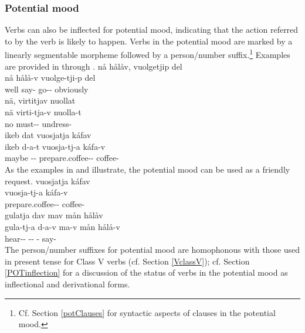 \subsubsection{Potential mood}\label{POTmood}
Verbs can also be inflected for potential mood, indicating that the action referred to by the verb is likely to happen. Verbs in the potential mood are marked by a linearly segmentable morpheme  followed by a person/number suffix.\footnote{Cf. Section \ref{potClauses} for syntactic aspects of clauses in the potential mood.} 
Examples are provided in  through .
\ea\label{potentialEx1}
\glll	nå hålåv, vuolgetjip del\\
	nå hålå-v vuolge-tji-p del\\
	well say- go-- obviously\\\nopagebreak
{}	
\z
\ea\label{potentialEx2}
\glll	nä, virtitjav nuollat\\
	nä virti-tja-v nuolla-t\\
	no must-- undress-\\\nopagebreak
{}	
\z
\ea\label{potentialEx3}
\glll	ikeb dat vuosjatja káfav\\
	ikeb d-a-t vuosja-tj-a káfa-v\\
	maybe -- prepare.coffee-- coffee-\\\nopagebreak
{}	
\z
As the examples in  and  illustrate, the potential mood can be used as a friendly request. 
\ea\label{potentialEx4}%
\glll	vuosjatja káfav\\
	vuosja-tj-a káfa-v\\
	prepare.coffee-- coffee-\\\nopagebreak
{}	
\z
\ea\label{potentialEx5}%
\glll	gulatja dav mav mån hålåv\\
	gula-tj-a d-a-v ma-v mån hålå-v\\
	hear-- -- -  say-\\\nopagebreak
{}	
\z
The person/number suffixes for potential mood are homophonous %
with those used in present tense for Class V verbs (cf. Section \ref{VclassV}); cf. Section \ref{POTinflection} for a discussion of the status of verbs in the potential mood as inflectional and derivational forms. 


